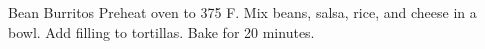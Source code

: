 \documentclass[../cookbook.tex]{subfiles}
\begin{document}
\begin{recipe}{Bean Burritos}{}{}
    Preheat oven to 375 \degrees{}F.
    Mix beans, salsa, rice, and cheese in a bowl.
    Add filling to tortillas. Bake for 20 minutes.

\end{recipe}
\end{document}
